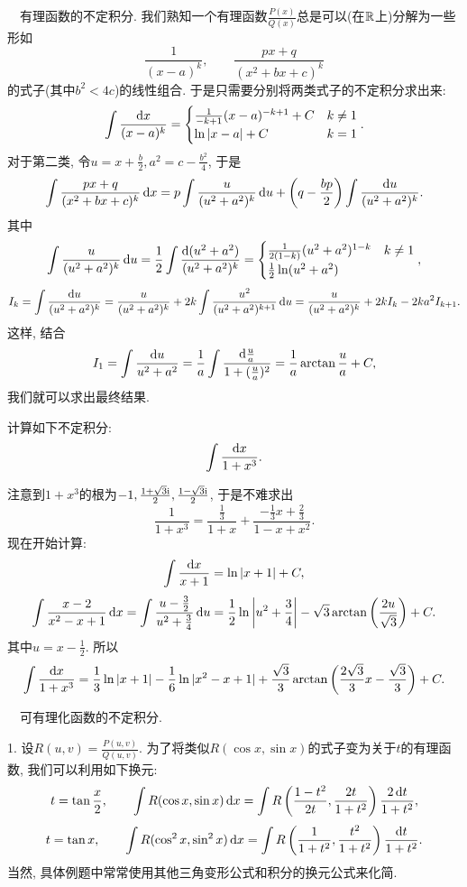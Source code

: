 ~~有理函数的不定积分. 我们熟知一个有理函数$\frac{P(x)}{Q(x)}$总是可以(在$\mathbb{R}$上)分解为一些形如$$\frac{1}{(x-a)^k},\qquad \frac{px+q}{(x^2+bx+c)^k}$$
的式子(其中$b^2<4c$)的线性组合. 于是只需要分别将两类式子的不定积分求出来: 
$$\int \frac{\mathop{}\!\mathrm{d} x}{(x-a)^k} = \begin{cases}
	\frac{1}{-k+1}(x-a)^{-k+1}+C & k\neq 1 \\ \ln |x-a| + C & k=1
\end{cases}.$$
对于第二类, 令$u=x+\frac{b}{2}, a^2=c-\frac{b^2}{4}$, 于是$$\int \frac{px+q}{(x^2+bx+c)^k} \mathop{}\!\mathrm{d} x = p \int \frac{u}{(u^2+a^2)^k} \mathop{}\!\mathrm{d} u + \left(q-\frac{bp}{2} \right) \int \frac{\mathop{}\!\mathrm{d} u}{(u^2+a^2)^k}.$$
其中$$\int \frac{u}{(u^2+a^2)^k} \mathop{}\!\mathrm{d} u = \frac{1}{2} \int \frac{\mathop{}\!\mathrm{d} (u^2+a^2)}{(u^2+a^2)^k} = \begin{cases}
	\frac{1}{2(1-k)}(u^2+a^2)^{1-k} & k\neq 1 \\ \frac{1}{2}\ln (u^2+a^2)
\end{cases}, $$
$$I_k = \int \frac{\mathop{}\!\mathrm{d} u}{(u^2+a^2)^k} = \frac{u}{(u^2+a^2)^k} + 2k \int \frac{u^2}{(u^2+a^2)^{k+1}} \mathop{}\!\mathrm{d} u = \frac{u}{(u^2+a^2)^k} + 2kI_k - 2ka^2I_{k+1}.$$
这样, 结合$$I_1 = \int \frac{\mathop{}\!\mathrm{d} u}{u^2+a^2} = \frac{1}{a} \int \frac{\mathop{}\!\mathrm{d} \frac{u}{a}}{1+(\frac{u}{a})^2} = \frac{1}{a} \arctan \frac{u}{a} + C,$$
我们就可以求出最终结果. 

\begin{example}
	计算如下不定积分: $$\int \frac{\mathop{}\!\mathrm{d} x}{1+x^3}. $$
\end{example}
\begin{solution}
	注意到$1+x^3$的根为$-1,\frac{1+\sqrt{3}\mathrm{i}}{2},\frac{1-\sqrt{3}\mathrm{i}}{2}$, 于是不难求出$$\frac{1}{1+x^3} = \frac{\frac{1}{3}}{1+x} + \frac{-\frac{1}{3}x+\frac{2}{3}}{1-x+x^2}. $$
	现在开始计算: $$\int \frac{\mathop{}\!\mathrm{d} x}{x+1} = \ln |x+1| + C,$$
	$$\int \frac{x-2}{x^2-x+1} \mathop{}\!\mathrm{d} x = \int \frac{u-\frac{3}{2}}{u^2+\frac{3}{4}} \mathop{}\!\mathrm{d} u = \frac{1}{2} \ln \left|u^2+\frac{3}{4} \right| -\sqrt{3} \arctan \left( \frac{2u}{\sqrt{3}} \right) + C.$$
	其中$u=x-\frac{1}{2}$. 所以$$\int \frac{\mathop{}\!\mathrm{d} x}{1+x^3} = \frac{1}{3} \ln |x+1| - \frac{1}{6} \ln |x^2-x+1| + \frac{\sqrt{3}}{3}\arctan \left( \frac{2\sqrt{3}}{3}x-\frac{\sqrt{3}}{3} \right)+C.$$
\end{solution}

~~可有理化函数的不定积分. 

1. 设$R(u,v)=\frac{P(u,v)}{Q(u,v)}$. 为了将类似$R(\cos x,\sin x)$的式子变为关于$t$的有理函数, 我们可以利用如下换元: 
$$t=\tan \frac{x}{2},\qquad \int R(\cos x,\sin x) \mathop{}\!\mathrm{d} x = \int R\left( \frac{1-t^2}{2t},\frac{2t}{1+t^2} \right) \frac{2\mathop{}\!\mathrm{d} t}{1+t^2}, $$
$$t=\tan x,\qquad \int R(\cos ^2 x,\sin ^2 x) \mathop{}\!\mathrm{d} x = \int R\left( \frac{1}{1+t^2},\frac{t^2}{1+t^2} \right) \frac{\mathop{}\!\mathrm{d} t}{1+t^2}. $$
当然, 具体例题中常常使用其他三角变形公式和积分的换元公式来化简. 

